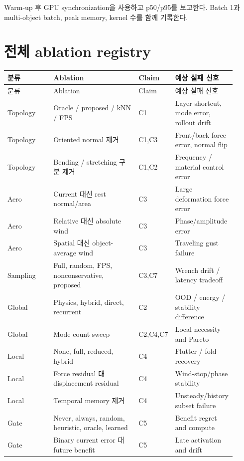 \documentclass[11pt,a4paper]{article}
\begin{document}
Warm-up 후 GPU synchronization을 사용하고 p50/p95를 보고한다.
Batch 1과 multi-object batch, peak memory, kernel 수를 함께 기록한다.

\section{전체 ablation registry}

\begin{longtable}{L{0.20\linewidth}L{0.37\linewidth}L{0.12\linewidth}L{0.22\linewidth}}
\toprule
분류 & Ablation & Claim & 예상 실패 신호 \\
\midrule
\endfirsthead
\toprule
분류 & Ablation & Claim & 예상 실패 신호 \\
\midrule
\endhead
Topology & Oracle / proposed / kNN / FPS & C1 & Layer shortcut, mode error, rollout drift \\
\addlinespace
Topology & Oriented normal 제거 & C1,C3 & Front/back force error, normal flip \\
\addlinespace
Topology & Bending / stretching 구분 제거 & C1,C2 & Frequency / material control error \\
\addlinespace
Aero & Current 대신 rest normal/area & C3 & Large deformation force error \\
\addlinespace
Aero & Relative 대신 absolute wind & C3 & Phase/amplitude error \\
\addlinespace
Aero & Spatial 대신 object-average wind & C3 & Traveling gust failure \\
\addlinespace
Sampling & Full, random, FPS, nonconservative, proposed & C3,C7 & Wrench drift / latency tradeoff \\
\addlinespace
Global & Physics, hybrid, direct, recurrent & C2 & OOD / energy / stability difference \\
\addlinespace
Global & Mode count sweep & C2,C4,C7 & Local necessity and Pareto \\
\addlinespace
Local & None, full, reduced, hybrid & C4 & Flutter / fold recovery \\
\addlinespace
Local & Force residual 대 displacement residual & C4 & Wind-stop/phase stability \\
\addlinespace
Local & Temporal memory 제거 & C4 & Unsteady/history subset failure \\
\addlinespace
Gate & Never, always, random, heuristic, oracle, learned & C5 & Benefit regret and compute \\
\addlinespace
Gate & Binary current error 대 future benefit & C5 & Late activation and drift \\

\end{longtable}
\end{document}
